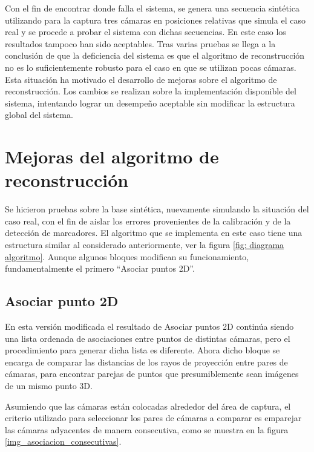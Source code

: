 Con el fin de encontrar donde falla el sistema, se genera una secuencia sintética utilizando  para la captura tres cámaras en posiciones relativas que simula el caso real y se procede a probar el sistema con dichas secuencias.  En este caso los resultados tampoco han sido aceptables. Tras varias pruebas se llega  a la conclusión de que la deficiencia del sistema es que el algoritmo de reconstrucción no es lo suficientemente robusto para el caso en que se utilizan pocas cámaras.\\
Esta situación ha motivado el desarrollo de mejoras sobre el algoritmo de reconstrucción. Los cambios se realizan sobre la implementación disponible del sistema, intentando lograr un desempeño aceptable sin modificar la estructura global del sistema.

\section{Mejoras del algoritmo de reconstrucción}


Se hicieron pruebas sobre la base sintética, nuevamente simulando la situación del caso real, con el fin de aislar los errores provenientes de la calibración y de la detección de marcadores.
El algoritmo que se implementa en este caso tiene una estructura similar al considerado anteriormente, ver la figura \ref{fig: diagrama algoritmo}. Aunque algunos bloques modifican su funcionamiento, fundamentalmente el primero  “Asociar puntos 2D”.

\subsection{Asociar punto 2D}

En esta versión modificada el resultado de Asociar puntos 2D continúa siendo una lista ordenada de asociaciones entre puntos de distintas cámaras, pero el procedimiento para generar dicha lista es diferente.  Ahora dicho bloque se encarga  de comparar  las distancias de los rayos de proyección entre pares de cámaras, para encontrar parejas de puntos que presumiblemente sean imágenes de un mismo punto 3D.  

Asumiendo que las cámaras están colocadas alrededor del área de captura, el criterio utilizado para seleccionar los pares de cámaras a comparar es emparejar las cámaras adyacentes de manera consecutiva, como se muestra en la figura  \ref{img_asociacion_consecutivas}.

